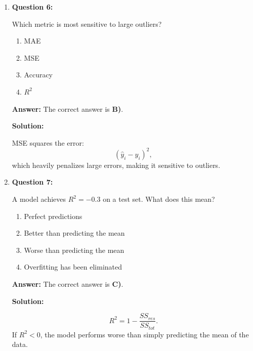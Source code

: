 \documentclass{article}
\newcommand{\vecb}[1]{\boldsymbol{#1}} %
\begin{document}
\begin{enumerate}
\textbf{Answer:} The correct answer is \textbf{B)}.

\textbf{Solution:}

Lasso uses the $L_1$ penalty applied to the parameter vector $\vecb{\theta}$: $\sum |\theta_j|$, which creates sharp corners in the optimization landscape.  
Solutions often lie on these corners, causing some coefficients to become exactly zero.

\vspace{6pt}

\item \textbf{Question 6:}

Which metric is most sensitive to large outliers?

\begin{enumerate}
    \item MAE
    \item MSE
    \item Accuracy
    \item $R^2$
\end{enumerate}

\textbf{Answer:} The correct answer is \textbf{B)}.

\textbf{Solution:}

MSE squares the error:
\[
(\hat{y}_i - y_i)^2,
\]
which heavily penalizes large errors, making it sensitive to outliers.

\vspace{6pt}

\item \textbf{Question 7:}

A model achieves $R^2 = -0.3$ on a test set. What does this mean?

\begin{enumerate}
    \item Perfect predictions
    \item Better than predicting the mean
    \item Worse than predicting the mean
    \item Overfitting has been eliminated
\end{enumerate}

\textbf{Answer:} The correct answer is \textbf{C)}.

\textbf{Solution:}

\[
R^2 = 1 - \frac{SS_{res}}{SS_{tot}}.
\]
If $R^2 < 0$, the model performs worse than simply predicting the mean of the data.

\vspace{6pt}


\end{enumerate}
\end{document}
